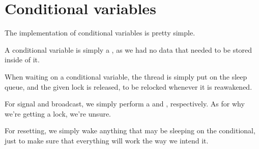 \section{Conditional variables}

The implementation of conditional variables is pretty simple.

A conditional variable is simply a , as we had no data that
needed to be stored inside of it.

When waiting on a conditional variable, the thread is simply put on the
sleep queue, and the given lock is released, to be relocked whenever it is
reawakened.

For signal and broadcast, we simply perform a  and
, respectively. As for why we're getting a lock, we're
unsure.

For resetting, we simply wake anything that may be sleeping on the conditional,
just to make sure that everything will work the way we intend it.
